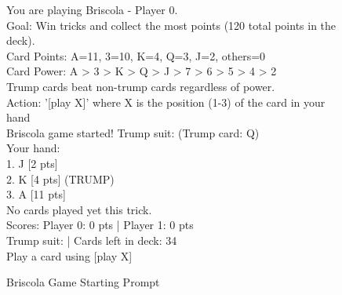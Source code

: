 \begin{figure}[H]
\centering

\begin{tcolorbox}[
    colback=blue!5!white,
    colframe=blue!40!white,
    left=0.8mm, right=0.8mm, top=0.8mm, bottom=0.8mm,
    boxsep=0.8mm,
    width=\textwidth,
    enhanced,
    attach boxed title to top center={yshift=-2mm},
    boxed title style={colback=blue!40!white},
    title={Briscola Game Starting Prompt},
    fontupper=\footnotesize,
    fonttitle=\footnotesize,
    label=box:Briscola
]

You are playing Briscola - Player 0.\\
Goal: Win tricks and collect the most points (120 total points in the deck).\\
Card Points: A=11, 3=10, K=4, Q=3, J=2, others=0\\
Card Power: A \textgreater{} 3 \textgreater{} K \textgreater{} Q \textgreater{} J \textgreater{} 7 \textgreater{} 6 \textgreater{} 5 \textgreater{} 4 \textgreater{} 2\\
Trump cards beat non-trump cards regardless of power.\\

Action: '[play X]' where X is the position (1-3) of the card in your hand\\

 Briscola game started! Trump suit:  (Trump card: Q)\\
 Your hand:\\
  \hspace*{1em}1. J [2 pts]\\
  \hspace*{1em}2. K [4 pts] (TRUMP)\\
  \hspace*{1em}3. A [11 pts]\\

No cards played yet this trick.\\

Scores: Player 0: 0 pts | Player 1: 0 pts\\
Trump suit:  | Cards left in deck: 34\\

Play a card using [play X]\\
\end{tcolorbox}

\caption{Briscola Game Starting Prompt} \label{box:Briscola}
\end{figure}



